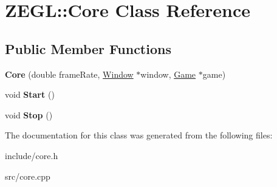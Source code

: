 \hypertarget{class_z_e_g_l_1_1_core}{}\section{Z\+E\+G\+L\+:\+:Core Class Reference}
\label{class_z_e_g_l_1_1_core}
\subsection*{Public Member Functions}
\begin{DoxyCompactItemize}
\item 
\hypertarget{class_z_e_g_l_1_1_core_a5a8f95feb47b3057726dbe2554dc8ac5}{}{\bfseries Core} (double frame\+Rate, \hyperlink{class_z_e_g_l_1_1_window}{Window} $\ast$window, \hyperlink{class_z_e_g_l_1_1_game}{Game} $\ast$game)\label{class_z_e_g_l_1_1_core_a5a8f95feb47b3057726dbe2554dc8ac5}

\item 
\hypertarget{class_z_e_g_l_1_1_core_a44f0db8bca5b6fd85f3948250287bdbd}{}void {\bfseries Start} ()\label{class_z_e_g_l_1_1_core_a44f0db8bca5b6fd85f3948250287bdbd}

\item 
\hypertarget{class_z_e_g_l_1_1_core_acab57c44acf4231e8310d93310667990}{}void {\bfseries Stop} ()\label{class_z_e_g_l_1_1_core_acab57c44acf4231e8310d93310667990}

\end{DoxyCompactItemize}


The documentation for this class was generated from the following files\+:\begin{DoxyCompactItemize}
\item 
include/core.\+h\item 
src/core.\+cpp\end{DoxyCompactItemize}
